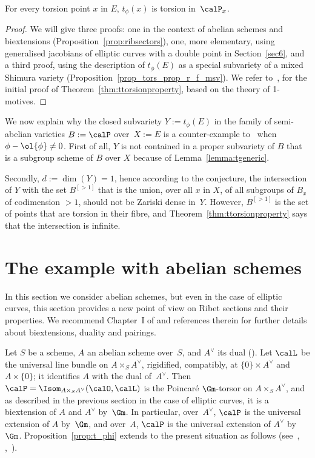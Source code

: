 \begin{Theorem}\label{thm:ttorsionproperty}
For every torsion point $x$ in $E$, $t_\phi(x)$ is torsion in~$\calP_x$.
\end{Theorem}
\begin{proof}
We will give three proofs: one in the context of abelian schemes and
biextensions (Proposition~\ref{prop:ribsectors}), one, more
elementary, using generalised jacobians of elliptic curves with a
double point in Section~\ref{sec6}, and a third proof, using the
description of $t_\phi(E)$ as a special subvariety of a mixed
Shimura variety (Proposition~\ref{prop_tors_prop_r_f_msv}).
We refer to~\cite[\S 1]{Bertrand11}, for the initial proof of
Theorem~\ref{thm:ttorsionproperty}, based on the theory of 1-motives.
\end{proof}
We now explain why the closed subvariety
$Y:=t_\phi(E)$ in the family of semi-abelian varieties $B:=\calP$
over~$X:=E$ is a counter-example to~\cite[Conj.\,6.1]{Pink2} when
$\phi-\ol{\phi}\neq 0$.
First of all, $Y$ is not contained in a proper subvariety of $B$ that
is a subgroup scheme of $B$ over $X$ because of
Lemma~\ref{lemma:tgeneric}.

Secondly, $d:=\dim(Y)=1$, hence according to the conjecture, the
intersection of $Y$ with the set $B^{[>1]}$ that is the union, over
all $x$ in $X$, of all subgroups of $B_x$ of codimension $>1$, should
not be Zariski dense in~$Y$. However, $B^{[>1]}$ is the set of points
that are torsion in their fibre, and
Theorem~\ref{thm:ttorsionproperty} says that the intersection is
infinite.

\section{The example with abelian schemes}\label{sec3}

In this section we consider abelian schemes, but even in the case of
elliptic curves, this section provides a new point of view on
Ribet sections and their properties. We recommend Chapter~I of
\cite{Moret-Bailly} and references therein for further details about
biextensions, duality and pairings.

Let $S$ be a scheme, $A$ an abelian scheme over~$S$, and $A^\vee$ its
dual (\cite[\S I.1]{Faltings-Chai}). Let $\calL$ be the
universal line bundle on $A\times_S A^\vee$, rigidified, compatibly,
at $\{0\}\times A^\vee$ and~$A\times\{0\}$; it identifies $A$ with the
dual of~$A^\vee$. Then $\calP=\Isom_{A\times_S A^\vee}(\calO,\calL)$
is the Poincaré $\Gm$-torsor on $A\times_S A^\vee$, and as described
in the previous section in the case of elliptic curves, it is a
biextension of $A$ and $A^\vee$ by~$\Gm$. In particular,
over~$A^\vee$, $\calP$ is the universal extension of $A$ by~$\Gm$, and
over~$A$, $\calP$ is the universal extension of $A^\vee$
by~$\Gm$. Proposition~\ref{prop:t_phi} extends to the present
situation as follows (see~\cite{Breen}, \hbox{\cite{Chambert-Loir99},
\cite[\S 8.3]{Lopuhaa}}).

